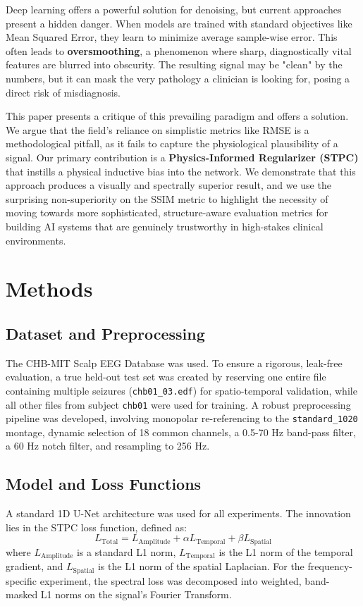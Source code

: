 \documentclass[11pt, a4paper]{article}
\begin{document}
Deep learning offers a powerful solution for denoising, but current approaches present a hidden danger. When models are trained with standard objectives like Mean Squared Error, they learn to minimize average sample-wise error. This often leads to \textbf{oversmoothing}, a phenomenon where sharp, diagnostically vital features are blurred into obscurity. The resulting signal may be "clean" by the numbers, but it can mask the very pathology a clinician is looking for, posing a direct risk of misdiagnosis.

This paper presents a critique of this prevailing paradigm and offers a solution. We argue that the field's reliance on simplistic metrics like RMSE is a methodological pitfall, as it fails to capture the physiological plausibility of a signal. Our primary contribution is a \textbf{Physics-Informed Regularizer (STPC)} that instills a physical inductive bias into the network. We demonstrate that this approach produces a visually and spectrally superior result, and we use the surprising non-superiority on the SSIM metric to highlight the necessity of moving towards more sophisticated, structure-aware evaluation metrics for building AI systems that are genuinely trustworthy in high-stakes clinical environments.

\section{Methods}
\subsection{Dataset and Preprocessing}
The CHB-MIT Scalp EEG Database \cite{shoeb2009application} was used. To ensure a rigorous, leak-free evaluation, a true held-out test set was created by reserving one entire file containing multiple seizures (\texttt{chb01\_03.edf}) for spatio-temporal validation, while all other files from subject \texttt{chb01} were used for training. A robust preprocessing pipeline was developed, involving monopolar re-referencing to the \texttt{standard\_1020} montage, dynamic selection of 18 common channels, a 0.5-70 Hz band-pass filter, a 60 Hz notch filter, and resampling to 256 Hz.

\subsection{Model and Loss Functions}
A standard 1D U-Net architecture was used for all experiments. The innovation lies in the STPC loss function, defined as:
\begin{equation}
    L_{\text{Total}} = L_{\text{Amplitude}} + \alpha L_{\text{Temporal}} + \beta L_{\text{Spatial}}
\end{equation}
where $L_{\text{Amplitude}}$ is a standard L1 norm, $L_{\text{Temporal}}$ is the L1 norm of the temporal gradient, and $L_{\text{Spatial}}$ is the L1 norm of the spatial Laplacian. For the frequency-specific experiment, the spectral loss was decomposed into weighted, band-masked L1 norms on the signal's Fourier Transform.
\end{document}
